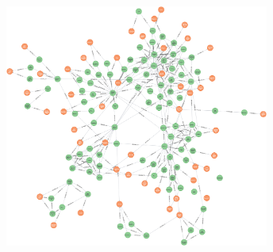 \begin{figure}[H]
    \vspace{1em}
    \centering
    \setlength{\abovecaptionskip}{10pt} %
    \includegraphics[height=8cm]{../assets/Neo4j工具图1126-150nodes.png}
    \label{fig:ch3-neo4j}
\end{figure}






